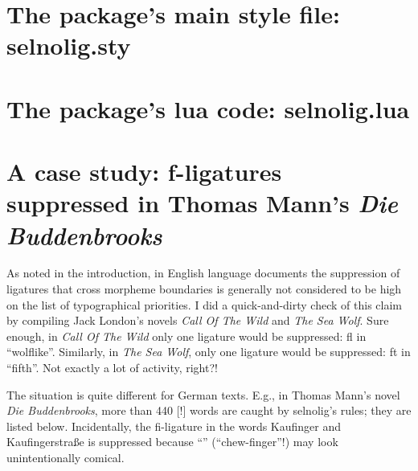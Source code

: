 \documentclass[11pt]{article}
\newcommand{\pkg}[1]{\textsf{#1}}
\begin{document}
\bigskip

\begin{multicols}{2}
\end{multicols}

\clearpage
\section[The package's main style file: selnolig.sty]
{The package's main style file: \pkg{selnolig.sty}}
\label{sec:sty}


\clearpage
\section[The package's lua code: selnolig.lua]{The package's lua code: \pkg{selnolig.lua}}
\label{sec:luacode}


\clearpage
\selnoligon
\section{A case study: f-ligatures suppressed in Thomas Mann's \emph{Die Buddenbrooks}} \label{sec:budd}


As noted in the introduction, in English language documents the suppression of ligatures that cross morpheme boundaries is generally not considered to be high on the list of typographical priorities. I did a quick-and-dirty check of this claim by compiling Jack London's novels \emph{Call Of The Wild} and \emph{The Sea Wolf}. Sure enough, in \emph{Call Of The Wild} only one ligature would be suppressed: fl in \enquote{wolflike}. Similarly, in \emph{The Sea Wolf}, only one ligature would be suppressed: ft in \enquote{fifth}. Not exactly a lot of activity, right?!

The situation is quite different for German texts. E.g., in Thomas Mann's novel \emph{Die Buddenbrooks}, more than 440 [!] words are caught by \pkg{selnolig}'s rules; they are listed below. Incidentally, the fi-ligature in the words Kaufinger and Kaufingerstraße is suppressed because \enquote{} (\enquote{chew-finger}!) may look unintentionally comical.

\enlargethispage{1\baselineskip}
\end{document}
